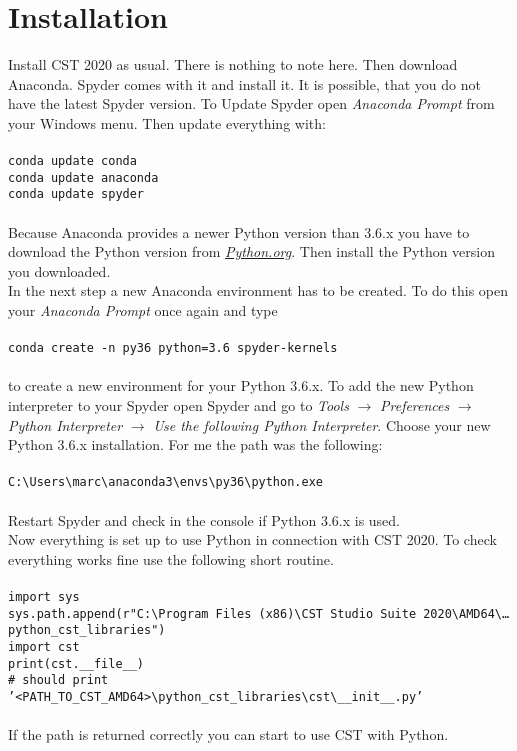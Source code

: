 \documentclass[12pt,accentcolor=tud2b, colorback, openany]{tudreport}
\begin{document}
	\chapter{Installation}
	Install CST 2020 as usual. There is nothing to note here. Then download Anaconda. Spyder comes with it and install it. It is possible, that you do not have the latest Spyder version. To Update Spyder open \textit{Anaconda Prompt} from your Windows menu. Then update everything with:\\
	\\
	\texttt{conda update conda\\
		conda update anaconda\\
		conda update spyder\\}\\
	Because Anaconda provides a newer Python version than 3.6.x you have to download the Python version from \href{https://www.python.org/downloads/}{\textit{Python.org}}. Then install the Python version you downloaded.\\
	In the next step a new Anaconda environment has to be created. To do this open your \textit{Anaconda Prompt} once again and type\\
	\\	
	\texttt{conda create -n py36 python=3.6 spyder-kernels}\\
	\\
	to create a new environment for your Python 3.6.x. To add the new Python interpreter to your Spyder open Spyder and go to \textit{Tools} $\rightarrow$ \textit{Preferences} $\rightarrow$ \textit{Python Interpreter} $\rightarrow$ \textit{Use the following Python Interpreter}. Choose your new Python 3.6.x installation. For me the path was the following:\\
	\\
	\texttt{C:\textbackslash Users\textbackslash marc\textbackslash anaconda3\textbackslash envs\textbackslash py36\textbackslash python.exe}\\
	\\
	Restart Spyder and check in the console if Python 3.6.x is used.\\
	Now everything is set up to use Python in connection with CST 2020. To check everything works fine use the following short routine.\\
	\\
	\texttt{import sys\\
		sys.path.append(r"C:\textbackslash Program Files (x86)\textbackslash CST Studio Suite 2020\textbackslash AMD64\textbackslash \dots \\ python\_cst\_libraries")\\
		import cst\\
		print(cst.\_\_file\_\_)\\ \# should print '<PATH\_TO\_CST\_AMD64>\textbackslash python\_cst\_libraries\textbackslash cst\textbackslash\_\_init\_\_.py'
	}\\
	\\
	If the path is returned correctly you can start to use CST with Python.
	
\end{document}
